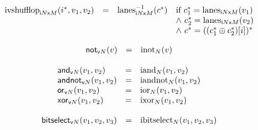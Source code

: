 $$
\begin{array}[t]{@{}lcl@{}l@{}}
{{\mathrm{ivshufflop}}}_{{{\mathsf{i}}{N}}{\mathsf{x}}{M}}({i^\ast}, v_1, v_2) & = & {{{{\mathrm{lanes}}}_{{{\mathsf{i}}{N}}{\mathsf{x}}{M}}^{{-1}}}}{({c^\ast})} & \quad
\begin{array}[t]{@{}l@{}}
\mbox{if}~ {c_1^\ast} = {{\mathrm{lanes}}}_{{{\mathsf{i}}{N}}{\mathsf{x}}{M}}(v_1) \\
{\land}~ {c_2^\ast} = {{\mathrm{lanes}}}_{{{\mathsf{i}}{N}}{\mathsf{x}}{M}}(v_2) \\
{\land}~ {c^\ast} = {(({c_1^\ast} \oplus {c_2^\ast}){}[i])^\ast} \\
\end{array} \\
\end{array}
$$

\vspace{1ex}

\vspace{1ex}

$$
\begin{array}[t]{@{}lcl@{}l@{}}
{\mathsf{not}}{{}_{{\mathsf{v}}{N}}(v)} & = & {{\mathrm{inot}}}_{N}(v) \\
\end{array}
$$

$$
\begin{array}[t]{@{}lcl@{}l@{}}
{\mathsf{and}}{{}_{{\mathsf{v}}{N}}(v_1, v_2)} & = & {{\mathrm{iand}}}_{N}(v_1, v_2) \\
{\mathsf{andnot}}{{}_{{\mathsf{v}}{N}}(v_1, v_2)} & = & {{\mathrm{iandnot}}}_{N}(v_1, v_2) \\
{\mathsf{or}}{{}_{{\mathsf{v}}{N}}(v_1, v_2)} & = & {{\mathrm{ior}}}_{N}(v_1, v_2) \\
{\mathsf{xor}}{{}_{{\mathsf{v}}{N}}(v_1, v_2)} & = & {{\mathrm{ixor}}}_{N}(v_1, v_2) \\
\end{array}
$$

$$
\begin{array}[t]{@{}lcl@{}l@{}}
{\mathsf{bitselect}}{{}_{{\mathsf{v}}{N}}(v_1, v_2, v_3)} & = & {{\mathrm{ibitselect}}}_{N}(v_1, v_2, v_3) \\
\end{array}
$$

